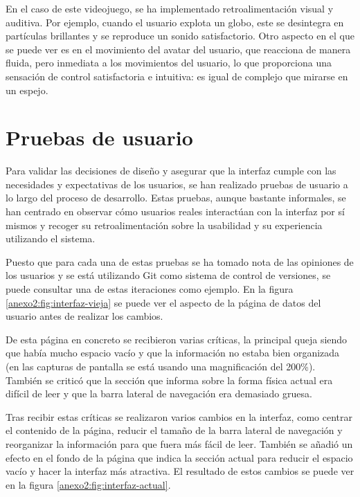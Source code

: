 En el caso de este videojuego, se ha implementado retroalimentación visual y
auditiva.  Por ejemplo, cuando el usuario explota un globo, este se desintegra
en partículas brillantes y se reproduce un sonido satisfactorio. Otro aspecto en
el que se puede ver es en el movimiento del avatar del usuario, que reacciona de
manera fluida, pero inmediata a los movimientos del usuario, lo que proporciona
una sensación de control satisfactoria e intuitiva: es igual de complejo que
mirarse en un espejo.

\section{Pruebas de usuario}
\label{anexo2:sec:diseno-pruebas-usuario}
Para validar las decisiones de diseño y asegurar que la interfaz cumple con las
necesidades y expectativas de los usuarios, se han realizado pruebas de usuario
a lo largo del proceso de desarrollo. Estas pruebas, aunque bastante informales,
se han centrado en observar cómo usuarios reales interactúan con la interfaz por
sí mismos y recoger su retroalimentación sobre la usabilidad y su experiencia
utilizando el sistema.

Puesto que para cada una de estas pruebas se ha tomado nota de las opiniones de
los usuarios y se está utilizando Git como sistema de control de versiones, se
puede consultar una de estas iteraciones como ejemplo. En la figura
\ref{anexo2:fig:interfaz-vieja} se puede ver el aspecto de la página de datos del
usuario antes de realizar los cambios.


De esta página en concreto se recibieron varias críticas, la principal queja
siendo que había mucho espacio vacío y que la información no estaba bien
organizada (en las capturas de pantalla se está usando una magnificación del
200\%). También se criticó que la sección que informa sobre la forma física
actual era difícil de leer y que la barra lateral de navegación era demasiado
gruesa.

Tras recibir estas críticas se realizaron varios cambios en la interfaz, como
centrar el contenido de la página, reducir el tamaño de la barra lateral de
navegación y reorganizar la información para que fuera más fácil de leer.
También se añadió un efecto en el fondo de la página que indica la sección
actual para reducir el espacio vacío y hacer la interfaz más atractiva. El
resultado de estos cambios se puede ver en la figura \ref{anexo2:fig:interfaz-actual}.



